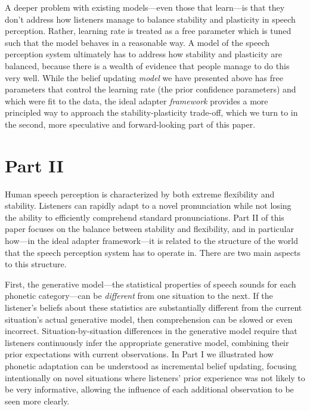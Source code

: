 A deeper problem with existing models---even those that learn---is that they don't address how listeners manage to balance stability and plasticity in speech perception.  Rather, learning rate is treated as a free parameter which is tuned such that the model behaves in a reasonable way.  A model of the speech perception system ultimately has to address how stability and plasticity are balanced, because there is a wealth of evidence that people manage to do this very well.  While the belief updating \emph{model} we have presented above has free parameters that control the learning rate (the prior confidence parameters) and which were fit to the data, the ideal adapter \emph{framework} provides a more principled way to approach the stability-plasticity trade-off, which we turn to in the second, more speculative and forward-looking part of this paper.  





\section*{Part II}
\label{sec:part-ii}

Human speech perception is characterized by both extreme flexibility and stability.  Listeners can rapidly adapt to a novel pronunciation while not losing the ability to efficiently comprehend standard pronunciations.  Part II of this paper focuses on the balance between stability and flexibility, and in particular how---in the ideal adapter framework---it is related to the structure of the world that the speech perception system has to operate in.  There are two main aspects to this structure.  

First, the generative model---the statistical properties of speech sounds for each phonetic category---can be \emph{different} from one situation to the next.  If the listener's beliefs about these statistics are substantially different from the current situation's actual generative model, then comprehension can be slowed or even incorrect.  Situation-by-situation differences in the generative model require that listeners continuously infer the appropriate generative model, combining their prior expectations with current observations. 
In Part I we illustrated how phonetic adaptation can be understood as incremental belief updating, focusing intentionally on novel situations where listeners' prior experience was not likely to be very informative, allowing the influence of each additional observation to be seen more clearly. 

